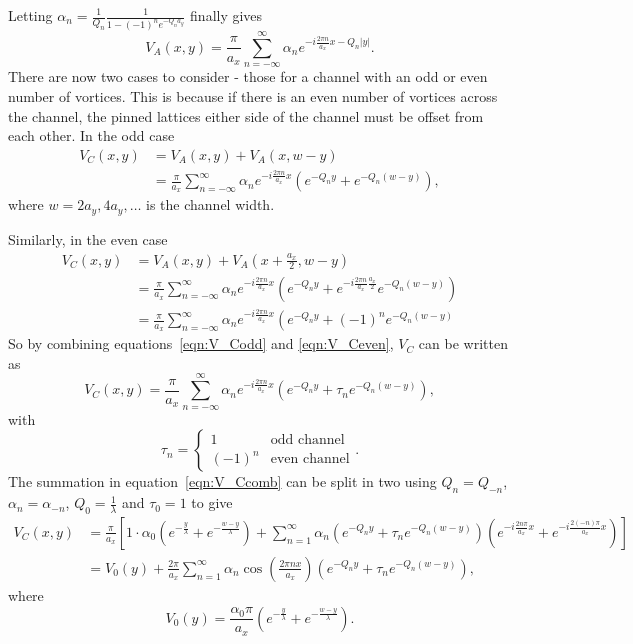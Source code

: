 \documentclass{article}
\numberwithin{equation}{section}
\begin{document}
Letting $\alpha_n = \frac{1}{Q_n}\frac{1}{1-(-1)^ne^{-Q_na_y}}$ finally gives
\begin{equation}
    V_A(x, y) = \frac{\pi}{a_x}\sum_{n=-\infty}^\infty\alpha_n e^{-i\frac{2\pi n}{a_x}x-Q_n|y|}.
\end{equation}
There are now two cases to consider - those for a channel with an odd or even number of vortices. This is because if there is an even number of vortices across the channel, the pinned lattices either side of the channel must be offset from each other.
In the odd case
\begin{align}
    V_C(x, y) &= V_A(x, y) + V_A(x, w-y) \nonumber \\
    &= \frac{\pi}{a_x}\sum_{n=-\infty}^\infty\alpha_n e^{-i\frac{2\pi n}{a_x}x} \left(e^{-Q_ny}+e^{-Q_n(w-y)}\right), \label{eqn:V_Codd}
\end{align}
where $w = 2a_y, 4a_y, \ldots$ is the channel width.

Similarly, in the even case
\begin{align}
    V_C(x, y) &= V_A(x, y) + V_A(x+\frac{a_x}{2}, w-y) \nonumber \\
    &= \frac{\pi}{a_x}\sum_{n=-\infty}^\infty\alpha_n e^{-i\frac{2\pi n}{a_x}x} \left(e^{-Q_ny}+e^{-i\frac{2\pi n}{a_x}\frac{a_x}{2}}e^{-Q_n(w-y)}\right) \nonumber \\
    &= \frac{\pi}{a_x}\sum_{n=-\infty}^\infty\alpha_n e^{-i\frac{2\pi n}{a_x}x} \left(e^{-Q_ny}+(-1)^ne^{-Q_n(w-y)}\right. \label{eqn:V_Ceven}
\end{align}
So by combining equations~\ref{eqn:V_Codd} and \ref{eqn:V_Ceven}, $V_C$ can be written as
\begin{equation}
    V_C(x, y) = \frac{\pi}{a_x}\sum_{n=-\infty}^\infty\alpha_n e^{-i\frac{2\pi n}{a_x}x} \left(e^{-Q_ny}+\tau_ne^{-Q_n(w-y)}\right), \label{eqn:V_Ccomb}
\end{equation}
with
\begin{equation}
    \tau_n = \left\{
    \begin{array}{ll}
        1 & \textrm{odd channel} \\
        (-1)^n & \textrm{even channel}
    \end{array}
    \right ..
\end{equation}
The summation in equation~\ref{eqn:V_Ccomb} can be split in two using $Q_n = Q_{-n}$, $\alpha_n = \alpha_{-n}$, $Q_0 = \frac{1}{\lambda}$ and $\tau_0 = 1$ to give
\begin{align}
    V_C(x, y) &= \frac{\pi}{a_x} \left[1\cdot\alpha_0\left(e^{-\frac{y}{\lambda}}+e^{-\frac{w-y}{\lambda}}\right) +\sum_{n=1}^\infty\alpha_n\left(e^{-Q_ny}+\tau_ne^{-Q_n(w-y)}\right) \left(e^{-i\frac{2n\pi}{a_x}x}+e^{-i\frac{2(-n)\pi}{a_x}x}\right) \right] \nonumber \\
    &= V_0(y) + \frac{2\pi}{a_x}\sum_{n=1}^\infty\alpha_n\cos\left(\frac{2\pi nx}{a_x}\right) \left(e^{-Q_ny}+\tau_ne^{-Q_n(w-y)}\right),
\end{align}
where
\begin{equation}
    V_0(y) = \frac{\alpha_0\pi}{a_x}\left(e^{-\frac{y}{\lambda}}+e^{-\frac{w-y}{\lambda}}\right).
\end{equation}
\end{document}
